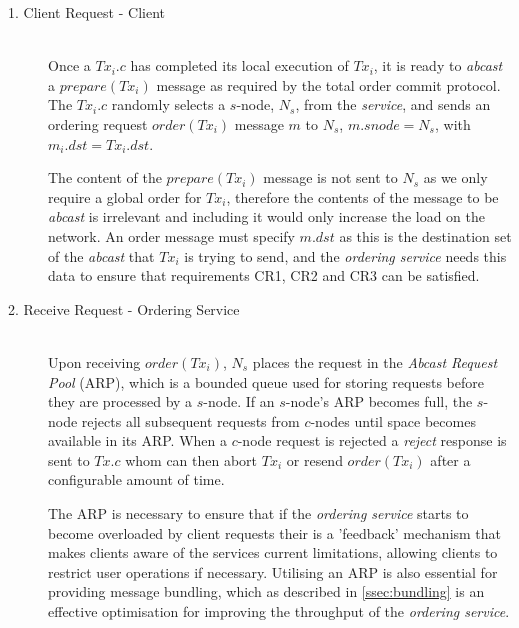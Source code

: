 	\begin{description}
		\item[1. Client Request - Client] \hfill \\
		Once a $Tx_i.c$ has completed its local execution of $Tx_i$, it is ready to \emph{abcast} a $prepare(Tx_i)$ message as required by the total order commit protocol.  The $Tx_i.c$ randomly selects a $s$-node, $N_s$, from the \emph{service}, and sends an ordering request $order(Tx_i)$ message $m$ to $N_s$, $m.snode = N_s$, with $m_i.dst = Tx_i.dst$.  
		
		The content of the $prepare(Tx_i)$ message is not sent to $N_s$ as we only require a global order for $Tx_i$, therefore the contents of the message to be \emph{abcast} is irrelevant and including it would only increase the load on the network.  An order message must specify $m.dst$ as this is the destination set of the \emph{abcast} that $Tx_i$ is trying to send, and the \emph{ordering service} needs this data to ensure that requirements CR1, CR2 and CR3 can be satisfied.  
		
		\item[2. Receive Request - Ordering Service] \hfill \\
		Upon receiving $order(Tx_i)$, $N_s$ places the request in the \emph{Abcast Request Pool} (ARP), which is a bounded queue used for storing requests before they are processed by a $s$-node.  If an $s$-node's ARP becomes full, the $s$-node rejects all subsequent requests from $c$-nodes until space becomes available in its ARP.  When a $c$-node request is rejected a \emph{reject} response is sent to $Tx.c$ whom can then abort $Tx_i$ or resend $order(Tx_i)$ after a configurable amount of time.    
		
		The ARP is necessary to ensure that if the \emph{ordering service} starts to become overloaded by client requests their is a 'feedback' mechanism that makes clients aware of the services current limitations, allowing clients to restrict user operations if necessary.  Utilising an ARP is also essential for providing message bundling, which as described in \ref{ssec:bundling} is an effective optimisation for improving the throughput of the \emph{ordering service}.  
		

\end{description}
